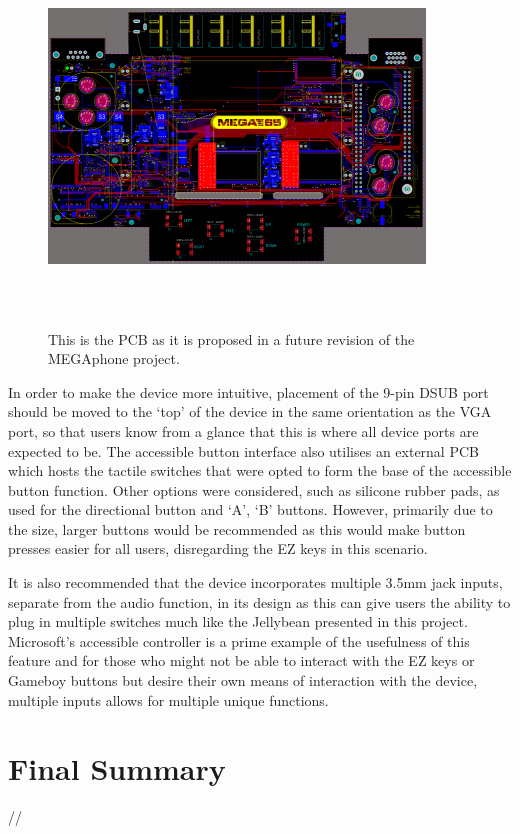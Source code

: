 \begin{figure} [h]
\begin{centering}
\includegraphics[width=10cm,height=10cm,keepaspectratio]{Figures/pcb_final.png}
\caption{This is the PCB as it is proposed in a future revision of the MEGAphone project.}
\label{fig:ThisFig}
\end{centering}
\end{figure}

In order to make the device more intuitive, placement of the 9-pin DSUB port should be moved to the ‘top’ of the device in the same orientation as the VGA port, so that users know from a glance that this is where all device ports are expected to be.
The accessible button interface also utilises an external PCB which hosts the tactile switches that were opted to form the base of the accessible button function. 
Other options were considered, such as silicone rubber pads, as used for the directional button and ‘A’, ‘B’ buttons. 
However, primarily due to the size, larger buttons would be recommended as this would make button presses easier for all users, disregarding the EZ keys in this scenario.

It is also recommended that the device incorporates multiple 3.5mm jack inputs, separate from the audio function, in its design as this can give users the ability to plug in multiple switches much like the Jellybean presented in this project.
Microsoft's accessible controller \cite{adaptive} is a prime example of the usefulness of this feature and for those who might not be able to interact with the EZ keys or Gameboy buttons but desire their own means of interaction with the device, multiple inputs allows for multiple unique functions.


\section{Final Summary}
//